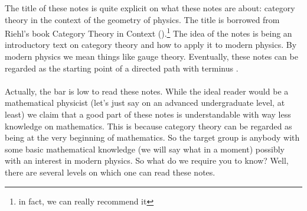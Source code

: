 The title of these notes is quite explicit on what these notes are about: category theory in the context of the geometry of physics. The title is borrowed from Riehl's book {\glqq}Category Theory in Context{\grqq} (\cite{52fbba46}).\footnote{in fact, we can really recommend it} The idea of the notes is being an introductory text on category theory and how to apply it to modern physics. By modern physics we mean things like {\glqq}gauge theory{\grqq}. Eventually, these notes can be regarded as the starting point of a {\glqq}directed path{\grqq} with terminus \cite{a565d200}.
\\\\
Actually, the bar is low to read these notes. While the ideal reader would be a mathematical physicist (let's just say on an advanced undergraduate level, at least) we claim that a good part of these notes is understandable with way less knowledge on mathematics. This is because category theory can be regarded as being at the very beginning of mathematics. So the target group is anybody with some basic mathematical knowledge (we will say {\glqq}what{\grqq} in a moment) possibly with an interest in modern physics. So what do we require you to know? Well, there are several levels on which one can read these notes.
